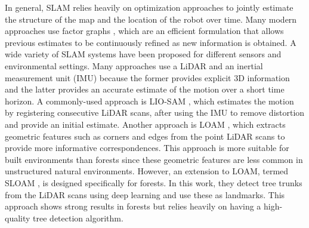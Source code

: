 In general, SLAM relies heavily on optimization approaches to jointly estimate the structure of the map and the location of the robot over time. Many modern approaches use factor graphs \cite{Dellaert2017FactorPerception}, which are an efficient formulation that allows previous estimates to be continuously refined as new information is obtained. A wide variety of SLAM systems have been proposed for different sensors and environmental settings. Many approaches use a LiDAR and an inertial measurement unit (IMU) because the former provides explicit 3D information and the latter provides an accurate estimate of the motion over a short time horizon. A commonly-used approach is LIO-SAM \cite{Shan2020LIO-SAM:Mapping}, which estimates the motion by registering consecutive LiDAR scans, after using the IMU to remove distortion and provide an initial estimate. Another approach is LOAM \cite{Zhang2017}, which extracts geometric features such as corners and edges from the point LiDAR scans to provide more informative correspondences. This approach is more suitable for built environments than forests since these geometric features are less common in unstructured natural environments. However, an extension to LOAM, termed SLOAM \cite{Chen2020SLOAM:Inventory}, is designed specifically for forests. In this work, they detect tree trunks from the LiDAR scans using deep learning and use these as landmarks. This approach shows strong results in forests but relies heavily on having a high-quality tree detection algorithm.


